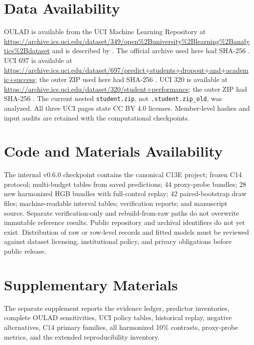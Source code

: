 \documentclass[11pt]{article}
\begin{document}
\section*{Data Availability}

OULAD is available from the UCI Machine Learning Repository at
\url{https://archive.ics.uci.edu/dataset/349/open%2Buniversity%2Blearning%2Banalytics%2Bdataset}
and is described by \citet{kuzilek2017oulad}. The official archive used here had SHA-256
\texttt{}.
UCI 697 is available at \url{https://archive.ics.uci.edu/dataset/697/predict+students+dropout+and+academic+success}; the outer ZIP used here had SHA-256 \texttt{}. UCI 320 is available at \url{https://archive.ics.uci.edu/dataset/320/student+performance}; the outer ZIP had SHA-256 \texttt{}. The current nested \texttt{student.zip}, not \texttt{.student.zip\_old}, was analyzed. All three UCI pages state CC BY 4.0 licenses. Member-level hashes and input audits are retained with the computational checkpoints.

\section*{Code and Materials Availability}

The internal v0.6.0 checkpoint contains the canonical C13E project; frozen C14 protocol; multi-budget tables from saved predictions; 44 proxy-probe bundles; 28 new harmonized HGB bundles with full-control replay; 42 paired-bootstrap draw files; machine-readable interval tables; verification reports; and manuscript source. Separate verification-only and rebuild-from-raw paths do not overwrite immutable reference results. Public repository and archival identifiers do not yet exist. Distribution of raw or row-level records and fitted models must be reviewed against dataset licensing, institutional policy, and privacy obligations before public release.

\section*{Supplementary Materials}

The separate supplement reports the evidence ledger, predictor inventories, complete OULAD sensitivities, UCI policy tables, historical replay, negative alternatives, C14 primary families, all harmonized 10\% contrasts, proxy-probe metrics, and the extended reproducibility inventory.
\end{document}
